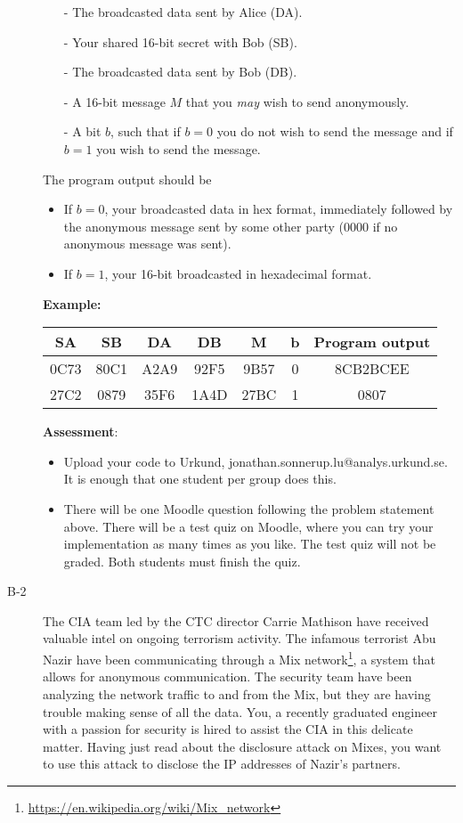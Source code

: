 \documentclass{article}
\begin{document}
\begin{description}
{\begin{itemize}
		\item[-] The broadcasted data sent by Alice (DA).
		\item[-] Your shared 16-bit secret with Bob (SB).
		\item[-] The broadcasted data sent by Bob (DB).
		\item[-] A 16-bit message $M$ that you \textit{may} wish to send anonymously.
		\item[-] A bit $b$, such that if $b=0$ you do not wish to send the message and if $b=1$ you wish to send the message.
	\end{itemize}
	The program output should be
	\begin{itemize}
	\item If $b=0$, your broadcasted data in hex format, immediately followed by the anonymous message sent by some other party (0000 if no anonymous message was sent).
	\item If $b=1$, your 16-bit broadcasted in hexadecimal format.
	\end{itemize}
	\textbf{Example:}\\
	\begin{center}
	\begin{tabular}{|c|c|c|c|c|c||c|}\hline
		\textbf{SA} & \textbf{SB} & \textbf{DA} & \textbf{DB} & \textbf{M} & \textbf{b} & \textbf{Program output}\\\hline
		0C73 & 80C1 & A2A9 & 92F5 & 9B57 & 0 & 8CB2BCEE\\\hline
		27C2 & 0879 & 35F6 & 1A4D & 27BC & 1 & 0807\\\hline
		
	\end{tabular}
	\end{center}
	\noindent\textbf{Assessment}:
	\begin{itemize}
		\item Upload your code to Urkund, jonathan.sonnerup.lu@analys.urkund.se. It is enough that one student per group does this.
		\item There will be one Moodle question following the problem statement above.
		There will be a test quiz on Moodle, where you can try your implementation as many times as you like. The test quiz will not be graded. Both students must finish the quiz.
	\end{itemize}
	}
	

	\item[B-2]{The CIA team led by the CTC director Carrie Mathison have received valuable intel on ongoing terrorism activity.
		The infamous terrorist Abu Nazir have been communicating through a Mix network\footnote{\url{https://en.wikipedia.org/wiki/Mix_network}}, 
		a system that allows for anonymous communication. The security team have been analyzing the network traffic to and from the Mix, but
		they are having trouble making sense of all the data. You, a recently graduated engineer with a passion for security is hired to assist
		the CIA in this delicate matter. Having just read about the disclosure attack on Mixes, you want to use this attack to disclose the
		IP addresses of Nazir's partners. 
		
}
\end{description}
\end{document}
